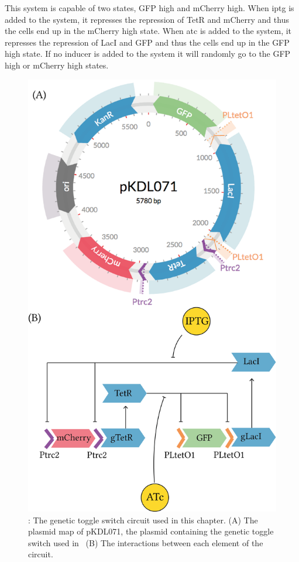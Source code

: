 This system is capable of two states, GFP high and mCherry high. When \acrshort{iptg} is added to the system, it represses the repression of TetR and mCherry and thus the cells end up in the mCherry high state. When \acrshort{atc} is added to the system, it represses the repression of LacI and GFP and thus the cells end up in the GFP high state. If no inducer is added to the system it will randomly go to the GFP high or mCherry high states.

\begin{figure}[tb]
	\begin{center}
		\includegraphics[scale=0.55]{../../chapters/chapterABCFlow/images/pKDL071_overview.png}
	\caption[LoF caption]{\label{fig:pKDL071map}: The genetic toggle switch circuit used in this chapter. (A) The plasmid map of pKDL071, the plasmid containing the genetic toggle switch used in~\textcite{Litcofsky:2012gr} (B) The interactions between each element of the circuit.}
	\end{center}
\end{figure}
\clearpage


